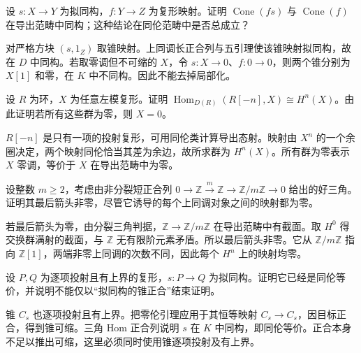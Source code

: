 \begin{exercise}\label{b4:ex:17-cone-localized}
	设 \(s:X\to Y\) 为拟同构，\(f:Y\to Z\) 为复形映射。证明 \(\operatorname{Cone}(fs)\) 与 \(\operatorname{Cone}(f)\) 在导出范畴中同构；这种结论在同伦范畴中是否总成立？
\end{exercise}
\begin{solution}
	对严格方块 \((s,1_Z)\) 取锥映射。上同调长正合列与五引理使该锥映射拟同构，故在 \(D\) 中同构。若取零调但不可缩的 \(X\)，令 \(s:X\to0\)、\(f:0\to0\)，则两个锥分别为 \(X[1]\) 和零，在 \(K\) 中不同构。因此不能去掉局部化。
\end{solution}

\begin{exercise}\label{b4:ex:17-cohomology-detect}
	设 \(R\) 为环，\(X\) 为任意左模复形。证明 \(\operatorname{Hom}_{D(R)}(R[-n],X)\cong H^n(X)\)。由此证明若所有这些群为零，则 \(X=0\)。
\end{exercise}
\begin{solution}
	\(R[-n]\) 是只有一项的投射复形，可用同伦类计算导出态射。映射由 \(X^n\) 的一个余圈决定，两个映射同伦恰当其差为余边，故所求群为 \(H^n(X)\)。所有群为零表示 \(X\) 零调，等价于 \(X\) 在导出范畴中为零。
\end{solution}

\begin{exercise}\label{b4:ex:17-split-cohomology-not-split}
	设整数 \(m\ge2\)，考虑由非分裂短正合列 \(0\to\mathbb Z\xrightarrow{m}\mathbb Z\to\mathbb Z/m\mathbb Z\to0\) 给出的好三角。证明其最后箭头非零，尽管它诱导的每个上同调对象之间的映射都为零。
\end{exercise}
\begin{solution}
	若最后箭头为零，由分裂三角判据，\(\mathbb Z\to\mathbb Z/m\mathbb Z\) 在导出范畴中有截面。取 \(H^0\) 得交换群满射的截面，与 \(\mathbb Z\) 无有限阶元素矛盾。所以最后箭头非零。它从 \(\mathbb Z/m\mathbb Z\) 指向 \(\mathbb Z[1]\)，两端非零上同调的次数不同，因此每个 \(H^n\) 上的映射均零。
\end{solution}

\begin{exercise}\label{b4:ex:17-quasi-between-models}
	设 \(P,Q\) 为逐项投射且有上界的复形，\(s:P\to Q\) 为拟同构。证明它已经是同伦等价，并说明不能仅以“拟同构的锥正合”结束证明。
\end{exercise}
\begin{solution}
	锥 \(C_s\) 也逐项投射且有上界。把零伦引理应用于其恒等映射 \(C_s\to C_s\)，因目标正合，得到锥可缩。三角 Hom 正合列说明 \(s\) 在 \(K\) 中同构，即同伦等价。正合本身不足以推出可缩，这里必须同时使用锥逐项投射及有上界。
\end{solution}

